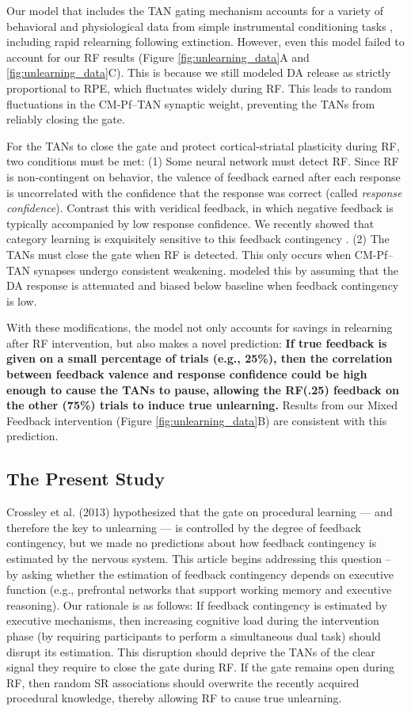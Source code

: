 \documentclass[apacite,draftfirst,man]{apa6}
\begin{document}
Our model that includes the TAN gating mechanism accounts for a variety of
behavioral and physiological data from simple instrumental conditioning tasks
\cite{AshbyCrossley2011, CrossleyEtAl2016}, including rapid relearning following
extinction. However, even this model failed to account for our RF results
(Figure \ref{fig:unlearning_data}A and \ref{fig:unlearning_data}C). This is
because we still modeled DA release as strictly proportional to RPE, which
fluctuates widely during RF. This leads to random fluctuations in the CM-Pf--TAN
synaptic weight, preventing the TANs from reliably closing the gate.

For the TANs to close the gate and protect cortical-striatal plasticity during
RF, two conditions must be met: (1) Some neural network must detect RF. Since RF
is non-contingent on behavior, the valence of feedback earned after each
response is uncorrelated with the confidence that the response was correct
(called \textit{response confidence}). Contrast this with veridical feedback, in
which negative feedback is typically accompanied by low response confidence. We
recently showed that category learning is exquisitely sensitive to this feedback
contingency \cite{AshbyVucovich2016}. (2) The TANs must close the gate when RF
is detected. This only occurs when CM-Pf--TAN synapses undergo consistent
weakening.  modeled this by assuming that the DA
response is attenuated and biased below baseline when feedback contingency is
low.

With these modifications, the model not only accounts for savings in relearning
after RF intervention, but also makes a novel prediction: \textbf{If true
feedback is given on a small percentage of trials (e.g., 25\%), then the
correlation between feedback valence and response confidence could be high
enough to cause the TANs to pause, allowing the RF(.25) feedback on the other
(75\%) trials to induce true unlearning.} Results from our Mixed Feedback
intervention (Figure \ref{fig:unlearning_data}B) are consistent with this
prediction.

\subsection*{The Present Study}
Crossley et al. (2013) hypothesized that the gate on procedural learning --- and
therefore the key to unlearning --- is controlled by the degree of feedback
contingency, but we made no predictions about how feedback contingency is
estimated by the nervous system. This article begins addressing this question --
by asking whether the estimation of feedback contingency depends on executive
function (e.g., prefrontal networks that support working memory and executive
reasoning). Our rationale is as follows: If feedback contingency is estimated by
executive mechanisms, then increasing cognitive load during the intervention
phase (by requiring participants to perform a simultaneous dual task) should
disrupt its estimation. This disruption should deprive the TANs of the clear
signal they require to close the gate during RF. If the gate remains open during
RF, then random SR associations should overwrite the recently acquired
procedural knowledge, thereby allowing RF to cause true unlearning.
\end{document}
